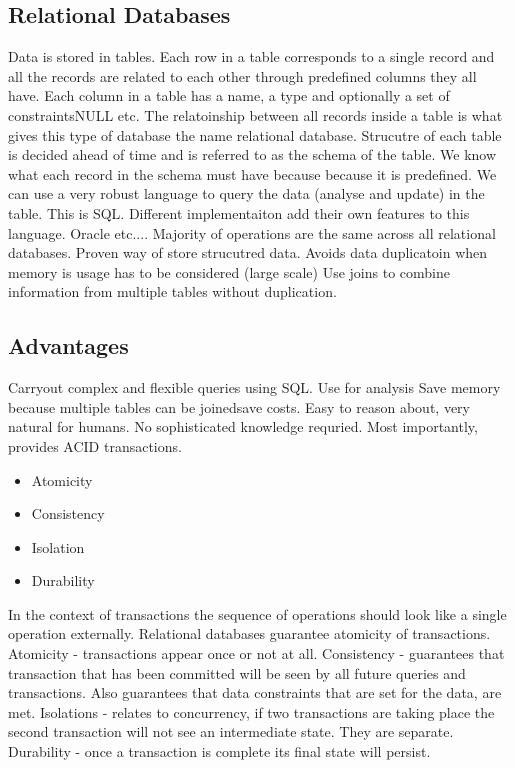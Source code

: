 \documentclass[a4paper, 11pt]{book}
\begin{document}
    \subsection{Relational Databases}
    Data is stored in tables.
    Each row in a table corresponds to a single record and all the records are related to each other through predefined columns they all have.
    Each column in a table has a name, a type and optionally a set of constraints\ldotsnot NULL etc.
    The relatoinship between all records inside a table is what gives this type of database the name relational database.
    Strucutre of each table is decided ahead of time and is referred to as the schema of the table.
    We know what each record in the schema must have because because it is predefined.
    We can use a very robust language to query the data (analyse and update) in the table. This is SQL.
    Different implementaiton add their own features to this language. Oracle etc....
    Majority of operations are the same across all relational databases.
    Proven way of store strucutred data.
    Avoids data duplicatoin when memory is usage has to be considered (large scale)
    Use joins to combine information from multiple tables without duplication.

    \subsection{Advantages}
    Carryout complex and flexible queries using SQL. Use for analysis
    Save memory because multiple tables can be joined\ldotsthus save costs.
    Easy to reason about, very natural for humans. No sophisticated knowledge requried.
    Most importantly, provides ACID transactions.

    \begin{itemize}
        \item Atomicity
        \item Consistency
        \item Isolation
        \item Durability
    \end{itemize}

    In the context of transactions the sequence of operations should look like a single operation externally.
    Relational databases guarantee atomicity of transactions.
    Atomicity - transactions appear once or not at all.
    Consistency - guarantees that transaction that has been committed will be seen by all future queries and transactions.
    Also guarantees that data constraints that are set for the data, are met.
    Isolations - relates to concurrency, if two transactions are taking place the second transaction will not see an intermediate state. They are separate.
    Durability - once a transaction is complete its final state will persist.
\end{document}
